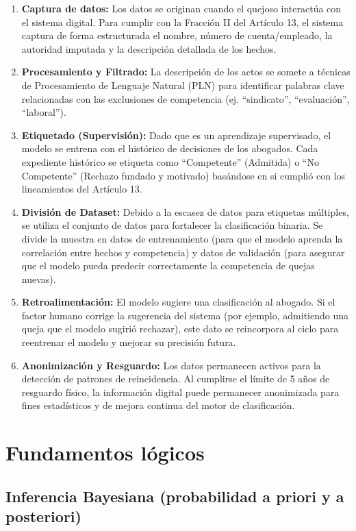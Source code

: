 \begin{enumerate}
\item \textbf{Captura de datos:} Los datos se originan cuando el quejoso interactúa con el sistema digital. Para cumplir con la Fracción II del Artículo 13, el sistema captura de forma estructurada el nombre, número de cuenta/empleado, la autoridad imputada y la descripción detallada de los hechos.
\item \textbf{Procesamiento y Filtrado:} La descripción de los actos se somete a técnicas de Procesamiento de Lenguaje Natural (PLN) para identificar palabras clave relacionadas con las exclusiones de competencia (ej. “sindicato”, “evaluación”, “laboral”).
\item \textbf{Etiquetado (Supervisión):} Dado que es un aprendizaje supervisado, el modelo se entrena con el histórico de decisiones de los abogados. Cada expediente histórico se etiqueta como “Competente” (Admitida) o “No Competente” (Rechazo fundado y motivado) basándose en si cumplió con los lineamientos del Artículo 13.
\item \textbf{División de Dataset:} Debido a la escasez de datos para etiquetas múltiples, se utiliza el conjunto de datos para fortalecer la clasificación binaria. Se divide la muestra en datos de entrenamiento (para que el modelo aprenda la correlación entre hechos y competencia) y datos de validación (para asegurar que el modelo pueda predecir correctamente la competencia de quejas nuevas).
\item \textbf{Retroalimentación:} El modelo sugiere una clasificación al abogado. Si el factor humano corrige la sugerencia del sistema (por ejemplo, admitiendo una queja que el modelo sugirió rechazar), este dato se reincorpora al ciclo para reentrenar el modelo y mejorar su precisión futura.
\item \textbf{Anonimización y Resguardo:} Los datos permanecen activos para la detección de patrones de reincidencia. Al cumplirse el límite de 5 años de resguardo físico, la información digital puede permanecer anonimizada para fines estadísticos y de mejora continua del motor de clasificación.
\end{enumerate}

\section{Fundamentos lógicos}

\subsection{Inferencia Bayesiana (probabilidad a priori y a posteriori)}

